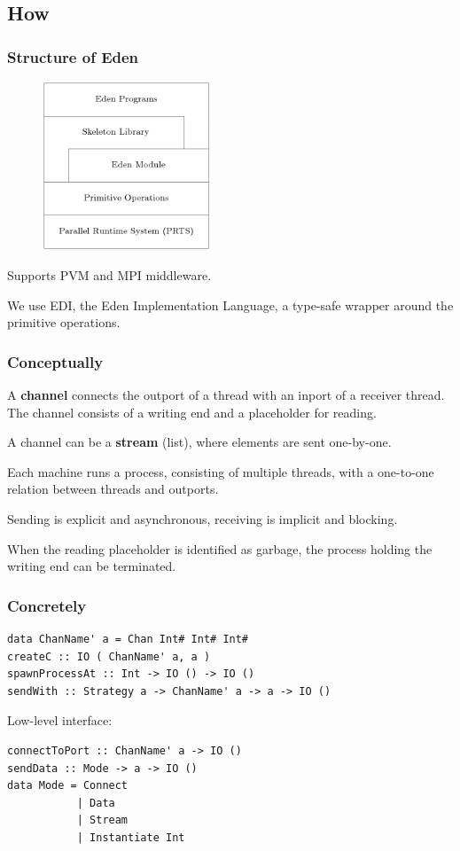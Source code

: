 \documentclass[12pt, danish]{beamer}
\begin{document}
\subsection{How}

\begin{frame}
\frametitle{Structure of Eden}

\begin{figure}
\includegraphics[width=5cm]{edenstructure.png}
\end{figure}

Supports PVM and MPI middleware.

We use EDI, the Eden Implementation Language, a type-safe wrapper
around the primitive operations.
\end{frame}

\begin{frame}
\frametitle{Conceptually}

A \textbf{channel} connects the outport of a thread with an inport of
a receiver thread.  The channel consists of a writing end and a
placeholder for reading.

\pause

A channel can be a \textbf{stream} (list), where elements are sent
one-by-one.

\pause

Each machine runs a process, consisting of multiple threads, with a
one-to-one relation between threads and outports.

\pause

Sending is explicit and asynchronous, receiving is implicit and
blocking.

\pause

When the reading placeholder is identified as garbage, the process
holding the writing end can be terminated.
\end{frame}

\begin{frame}[fragile]
\frametitle{Concretely}

\begin{verbatim}
data ChanName' a = Chan Int# Int# Int#
createC :: IO ( ChanName' a, a )
spawnProcessAt :: Int -> IO () -> IO ()
sendWith :: Strategy a -> ChanName' a -> a -> IO ()
\end{verbatim}
\pause
Low-level interface:
\begin{verbatim}
connectToPort :: ChanName' a -> IO ()
sendData :: Mode -> a -> IO ()
data Mode = Connect
           | Data
           | Stream
           | Instantiate Int
\end{verbatim}

\end{frame}
\end{document}
